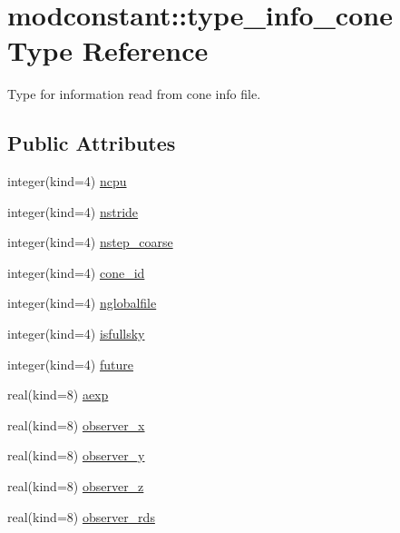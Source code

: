\hypertarget{structmodconstant_1_1type__info__cone}{\section{modconstant\-:\-:type\-\_\-info\-\_\-cone Type Reference}
\label{structmodconstant_1_1type__info__cone}
}


Type for information read from cone info file.  


\subsection*{Public Attributes}
\begin{DoxyCompactItemize}
\item 
integer(kind=4) \hyperlink{structmodconstant_1_1type__info__cone_a043cafa84fa677b3d924c69fa9808dd5}{ncpu}
\item 
integer(kind=4) \hyperlink{structmodconstant_1_1type__info__cone_a7a8405461f75f1428b69e170ced58b66}{nstride}
\item 
integer(kind=4) \hyperlink{structmodconstant_1_1type__info__cone_a9790d17feaf56655b080296bcccc2e36}{nstep\-\_\-coarse}
\item 
integer(kind=4) \hyperlink{structmodconstant_1_1type__info__cone_a461df4d2862ce0b7f4f26518c08bb7b6}{cone\-\_\-id}
\item 
integer(kind=4) \hyperlink{structmodconstant_1_1type__info__cone_a792bb4b0eeea2cef9d4edd825540396f}{nglobalfile}
\item 
integer(kind=4) \hyperlink{structmodconstant_1_1type__info__cone_a088d6561f49af5196c4bd87190c60ee1}{isfullsky}
\item 
integer(kind=4) \hyperlink{structmodconstant_1_1type__info__cone_aadbe0bd1d0d5938151941cf39f8c1cbf}{future}
\item 
real(kind=8) \hyperlink{structmodconstant_1_1type__info__cone_a282cf84b0f27f97f86d5efb8845f1a4b}{aexp}
\item 
real(kind=8) \hyperlink{structmodconstant_1_1type__info__cone_a5e4f264a3e87ff2189a91c099ba60716}{observer\-\_\-x}
\item 
real(kind=8) \hyperlink{structmodconstant_1_1type__info__cone_a71b2abc44f717415d0cd7e8cd13ba7dd}{observer\-\_\-y}
\item 
real(kind=8) \hyperlink{structmodconstant_1_1type__info__cone_a7a5d9fc17589735d67e86f25c2375538}{observer\-\_\-z}
\item 
real(kind=8) \hyperlink{structmodconstant_1_1type__info__cone_a81805ab92d84e021f5005ec101b08397}{observer\-\_\-rds}

\end{DoxyCompactItemize}
